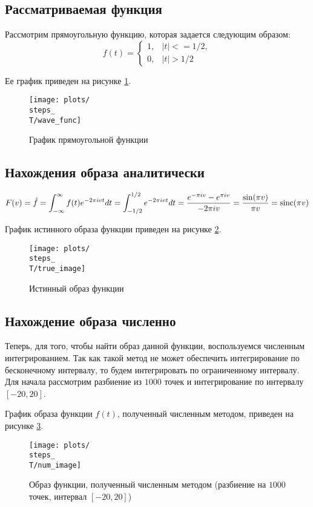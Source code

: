 \subsection{Рассматриваемая функция}
\def\steps{1000}
\def\T{20}

Рассмотрим прямоугольную функцию, которая задается следующим образом:
\begin{equation}
    f(t) = \begin{cases}
        1, & |t| <= 1/2, \\
        0, & |t| > 1/2
    \end{cases}
\end{equation}

Ее график приведен на рисунке \ref{fig:\steps_\T_wave_func}.
\begin{figure}[ht!]
    \centering
    \texttt{[image: plots/\\steps\_\\T/wave\_func]}
    \caption{График прямоугольной функции}
    \label{fig:\steps_\T_wave_func}
\end{figure}

\subsection{Нахождения образа аналитически}
\begin{equation}
    F(v) = \hat{f} = \int_{-\infty}^{\infty} f(t) e^{-2\pi i v t} dt = \int_{-1/2}^{1/2} e^{-2\pi i v t} dt = \frac{e^{-\pi i v} - e^{\pi i v}}{-2\pi i v} = \frac{\sin(\pi v)}{\pi v} = \operatorname{\text{sinc}}(\pi v)
\end{equation}

График истинного образа функции приведен на рисунке \ref{fig:\steps_\T_true_image}.
\begin{figure}[ht!]
    \centering
    \texttt{[image: plots/\\steps\_\\T/true\_image]}
    \caption{Истинный образ функции}
    \label{fig:\steps_\T_true_image}
\end{figure}

\subsection{Нахождение образа численно}
Теперь, для того, чтобы найти образ данной функции, воспользуемся численным интегрированием. 
Так как такой метод не может обеспечить интегрирование по бесконечному интервалу, то будем интегрировать по ограниченному интервалу.
Для начала рассмотрим разбиение из $\steps$ точек и интегрирование по интервалу $[-\T, \T]$.

График образа функции $f(t)$, полученный численным методом, приведен на рисунке \ref{fig:\steps_\T_num_image}.
\begin{figure}[ht!]
    \centering
    \texttt{[image: plots/\\steps\_\\T/num\_image]}
    \caption{Образ функции, полученный численным методом (разбиение на $\steps$ точек, интервал $[-\T, \T]$)}
    \label{fig:\steps_\T_num_image}
\end{figure}

